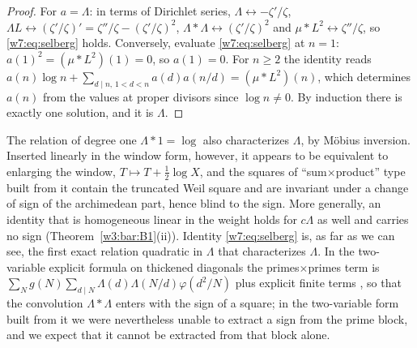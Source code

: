 \documentclass[11pt]{amsart}
\theoremstyle{definition}
\theoremstyle{remark}
\numberwithin{equation}{section}
\begin{document}
\begin{proof}
For $a=\Lambda$: in terms of Dirichlet series, $\Lambda\leftrightarrow-\zeta'/\zeta$, $\Lambda L\leftrightarrow
(\zeta'/\zeta)'=\zeta''/\zeta-(\zeta'/\zeta)^2$, $\Lambda\ast\Lambda\leftrightarrow(\zeta'/\zeta)^2$ and
$\mu\ast L^2\leftrightarrow\zeta''/\zeta$, so \eqref{w7:eq:selberg} holds. Conversely, evaluate
\eqref{w7:eq:selberg} at $n=1$: $a(1)^2=(\mu\ast L^2)(1)=0$, so $a(1)=0$. For $n\ge2$ the identity reads
$a(n)\log n+\sum_{d\mid n,\,1<d<n}a(d)a(n/d)=(\mu\ast L^2)(n)$, which determines $a(n)$ from the values at
proper divisors since $\log n\ne0$. By induction there is exactly one solution, and it is $\Lambda$.
\end{proof}

The relation of degree one $\Lambda\ast1=\log$ also characterizes $\Lambda$, by M\"obius inversion. Inserted
linearly in the window form, however, it appears to be equivalent to enlarging the window,
$T\mapsto T+\frac12\log X$, and the squares of ``sum$\times$product'' type built from it contain the truncated
Weil square and are invariant under a change of sign of the archimedean part, hence blind to the sign. More
generally, an identity that is homogeneous linear in the weight holds for $c\Lambda$ as well and carries no
sign (Theorem~\ref{w3:bar:B1}(ii)). Identity \eqref{w7:eq:selberg} is, as far as we can see, the first exact
relation quadratic in $\Lambda$ that characterizes $\Lambda$. In the two-variable explicit formula on thickened
diagonals the primes$\times$primes term is
$\sum_N g(N)\sum_{d\mid N}\Lambda(d)\Lambda(N/d)\varphi(d^2/N)$ plus explicit finite terms
\cite[Theorem~5.4]{P28}, so that the convolution $\Lambda\ast\Lambda$ enters with the sign of a square; in the
two-variable form built from it we were nevertheless unable to extract a sign from the prime block, and we
expect that it cannot be extracted from that block alone.
\end{document}

